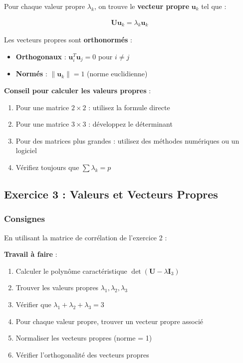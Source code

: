 \documentclass[11pt,a4paper]{article}
\begin{document}
Pour chaque valeur propre $\lambda_k$, on trouve le \textbf{vecteur propre} $\mathbf{u}_k$ tel que :

\begin{align*}
\mathbf{U}\mathbf{u}_k = \lambda_k \mathbf{u}_k
\end{align*}

Les vecteurs propres sont \textbf{orthonormés} :
\begin{itemize}
    \item \textbf{Orthogonaux} : $\mathbf{u}_i^T \mathbf{u}_j = 0$ pour $i \neq j$
    \item \textbf{Normés} : $\|\mathbf{u}_k\| = 1$ (norme euclidienne)
\end{itemize}

\begin{conseilbox}
\textbf{Conseil pour calculer les valeurs propres} :
\begin{enumerate}
    \item Pour une matrice $2 \times 2$ : utilisez la formule directe
    \item Pour une matrice $3 \times 3$ : développez le déterminant
    \item Pour des matrices plus grandes : utilisez des méthodes numériques ou un logiciel
    \item Vérifiez toujours que $\sum \lambda_k = p$
\end{enumerate}
\end{conseilbox}

\newpage

\subsection{Exercice 3 : Valeurs et Vecteurs Propres}

\subsubsection{Consignes}

En utilisant la matrice de corrélation de l'exercice 2 :

\textbf{Travail à faire} :
\begin{enumerate}
    \item Calculer le polynôme caractéristique $\det(\mathbf{U} - \lambda \mathbf{I}_3)$
    \item Trouver les valeurs propres $\lambda_1, \lambda_2, \lambda_3$
    \item Vérifier que $\lambda_1 + \lambda_2 + \lambda_3 = 3$
    \item Pour chaque valeur propre, trouver un vecteur propre associé
    \item Normaliser les vecteurs propres (norme = 1)
    \item Vérifier l'orthogonalité des vecteurs propres
\end{enumerate}
\end{document}
